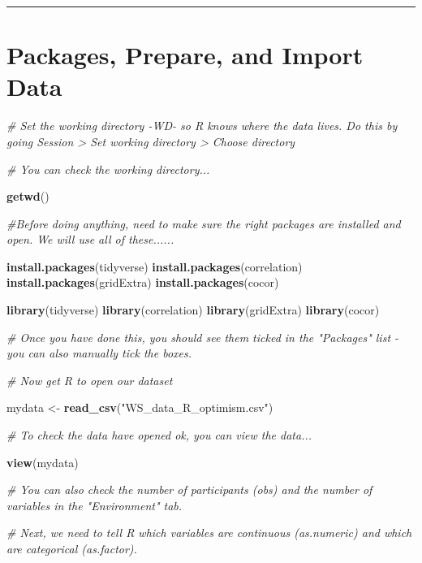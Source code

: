 \documentclass[
]{book}
\newenvironment{Shaded}{\begin{snugshade}}{\end{snugshade}}
\newcommand{\CommentTok}[1]{\textcolor[rgb]{0.56,0.35,0.01}{\textit{#1}}}
\newcommand{\FunctionTok}[1]{\textcolor[rgb]{0.13,0.29,0.53}{\textbf{#1}}}
\newcommand{\NormalTok}[1]{#1}
\newcommand{\OtherTok}[1]{\textcolor[rgb]{0.56,0.35,0.01}{#1}}
\newcommand{\StringTok}[1]{\textcolor[rgb]{0.31,0.60,0.02}{#1}}
\let\oldsection\section
\renewcommand{\section}{\needspace{5\baselineskip}\oldsection}
\begin{document}
\begin{center}\rule{0.5\linewidth}{0.5pt}\end{center}

\section{\texorpdfstring{\textbf{Packages, Prepare, and Import Data}}{Packages, Prepare, and Import Data}}\label{packages-prepare-and-import-data}

\begin{Shaded}
\begin{Highlighting}[]
\CommentTok{\# Set the working directory {-}WD{-} so R knows where the data lives. Do this by going Session \textgreater{} Set working directory \textgreater{} Choose directory}

\CommentTok{\# You can check the working directory...}

\FunctionTok{getwd}\NormalTok{()}

\CommentTok{\#Before doing anything, need to make sure the right packages are installed and open. We will use all of these......}

\FunctionTok{install.packages}\NormalTok{(tidyverse)}
\FunctionTok{install.packages}\NormalTok{(correlation)}
\FunctionTok{install.packages}\NormalTok{(gridExtra)}
\FunctionTok{install.packages}\NormalTok{(cocor)}

\FunctionTok{library}\NormalTok{(tidyverse)}
\FunctionTok{library}\NormalTok{(correlation)}
\FunctionTok{library}\NormalTok{(gridExtra)}
\FunctionTok{library}\NormalTok{(cocor)}

\CommentTok{\# Once you have done this, you should see them ticked in the "Packages" list {-} you can also manually tick the boxes.}

\CommentTok{\# Now get R to open our dataset}

\NormalTok{mydata }\OtherTok{\textless{}{-}} \FunctionTok{read\_csv}\NormalTok{(}\StringTok{"WS\_data\_R\_optimism.csv"}\NormalTok{)}

\CommentTok{\# To check the data have opened ok, you can view the data...}

\FunctionTok{view}\NormalTok{(mydata)}

\CommentTok{\# You can also check the number of participants (obs) and the number of variables in the "Environment" tab.}

\CommentTok{\# Next, we need to tell R which variables are continuous (as.numeric) and which are categorical (as.factor).}


\end{Highlighting}
\end{Shaded}
\end{document}
